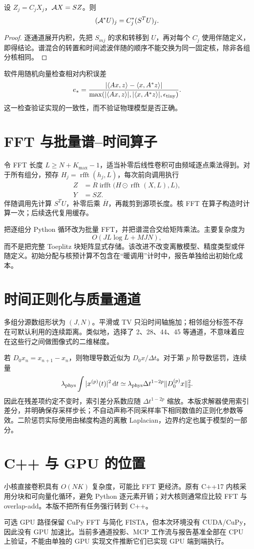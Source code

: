 \begin{proposition}[谱--时间模型的伴随]
设 $Z_j=C_jX_j$，$\mathcal{A} X=SZ$。则
\begin{equation}
 (\mathcal{A}^*U)_j=C_j^*(S^TU)_j.
\end{equation}
\end{proposition}
\begin{proof}
逐通道展开内积，先把 $S_{mj}$ 的求和转移到 $U$，再对每个 $C_j$ 使用伴随定义，即得结论。谱混合的转置和时间滤波伴随的顺序不能交换为同一固定核，除非各组分核相同。
\end{proof}
软件用随机向量检查相对内积误差
\begin{equation}
 e_* =\frac{|\langle Ax,z\rangle-\langle x,A^*z\rangle|}
 {\max(|\langle Ax,z\rangle|,|\langle x,A^*z\rangle|,\epsilon_{\rm tiny})}.
\end{equation}
这一检查验证实现的一致性，而不验证物理模型是否正确。

\section{FFT 与批量谱--时间算子}
令 FFT 长度 $L\ge N+K_{\max}-1$，适当补零后线性卷积可由频域逐点乘法得到。对于所有组分，预存 $H_j=\operatorname{rfft}(h_j,L)$，每次前向调用执行
\begin{align}
 Z &= R\operatorname{irfft}\bigl(H\odot\operatorname{rfft}(X,L),L\bigr),\\
 Y &= SZ.
\end{align}
伴随调用先计算 $S^TU$，补零后乘 $\overline H$，再裁剪到源项长度。核 FFT 在算子构造时计算一次；后续迭代复用缓存。

 把逐组分 Python 循环改为批量 FFT，并把谱混合交给矩阵乘法。主要复杂度为
\begin{equation}
 O(JL\log L+MJN),
\end{equation}
而不是把完整 Toeplitz 块矩阵显式存储。该改进不改变离散模型、精度类型或伴随定义。初始分配与核预计算不包含在“暖调用”计时中，报告单独给出初始化成本。

\section{时间正则化与质量通道}
多组分源数组形状为 $(J,N)$。平滑或 TV 只沿时间轴施加；相邻组分标签不存在可默认利用的连续距离。类似地，选择了 2、28、44、45 等通道，不意味着应在这些行之间做图像式的二维梯度。

若 $D_0x_n=x_{n+1}-x_n$，则物理导数近似为 $D_0x/\Delta t$。对于第 $p$ 阶导数惩罚，连续量
\begin{equation}
\lambda_{\rm phys}\int |x^{(p)}(t)|^2\,\mathrm dt
\simeq \lambda_{\rm phys}\Delta t^{1-2p}\|D_0^{(p)}x\|_2^2.
\end{equation}
因此在残差项约定不变时，索引差分系数应随 $\Delta t^{1-2p}$ 缩放。本版求解器使用索引差分，并明确保存采样步长；不自动声称不同采样率下相同数值的正则化参数等效。二阶惩罚实际使用由梯度构造的离散 Laplacian，边界约定也属于模型的一部分。

\section{C++ 与 GPU 的位置}
小核直接卷积具有 $O(NK)$ 复杂度，可能比 FFT 更经济。原有 C++17 内核采用分块和可向量化循环，避免 Python 逐元素开销；对大核则通常应比较 FFT 与 overlap-add。本版不把所有任务强行转到 C++。

可选 GPU 路径保留 CuPy FFT 与简化 FISTA，但本次环境没有 CUDA/CuPy，因此没有 GPU 加速比。当前多通道投影、MCP 工作流与报告基准全部在 CPU 上验证，不能由单独的 GPU 实现文件推断它们已实现 GPU 端到端执行。
